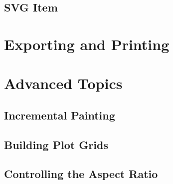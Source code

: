 \documentclass[12pt,a4paper]{book}
\begin{document}
\section{SVG Item}

\chapter{Exporting and Printing}

\chapter{Advanced Topics}

\section{Incremental Painting}

\section{Building Plot Grids}

\section{Controlling the Aspect Ratio}
\end{document}

